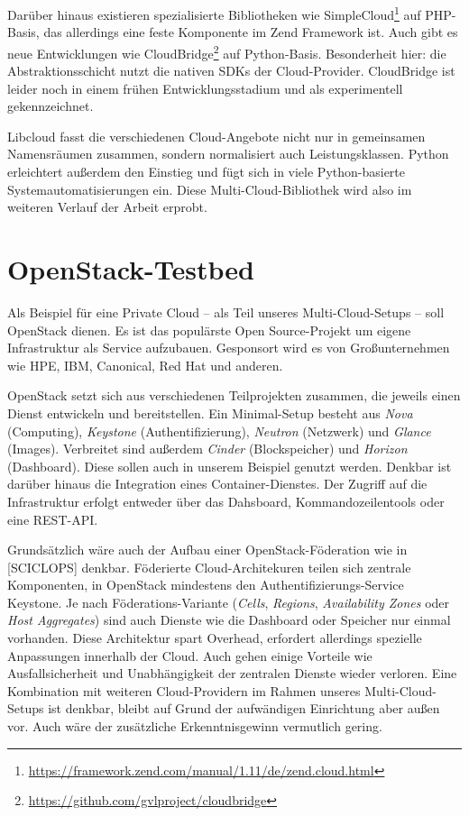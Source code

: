 Darüber hinaus existieren spezialisierte Bibliotheken wie SimpleCloud\footnote{\url{https://framework.zend.com/manual/1.11/de/zend.cloud.html}} auf PHP-Basis, das allerdings eine feste Komponente im Zend Framework ist. Auch gibt es neue Entwicklungen wie CloudBridge\footnote{\url{https://github.com/gvlproject/cloudbridge}} auf Python-Basis. Besonderheit hier: die Abstraktionsschicht nutzt die nativen SDKs der Cloud-Provider. CloudBridge ist leider noch in einem frühen Entwicklungsstadium und als experimentell gekennzeichnet.

Libcloud fasst die verschiedenen Cloud-Angebote nicht nur in gemeinsamen Namensräumen zusammen, sondern normalisiert auch Leistungsklassen. Python erleichtert außerdem den Einstieg und fügt sich in viele Python-basierte Systemautomatisierungen ein. Diese Multi-Cloud-Bibliothek wird also im weiteren Verlauf der Arbeit erprobt.


\section{OpenStack-Testbed}

Als Beispiel für eine Private Cloud -- als Teil unseres Multi-Cloud-Setups -- soll OpenStack dienen. Es ist das populärste Open Source-Projekt um eigene Infrastruktur als Service aufzubauen. Gesponsort wird es von Großunternehmen wie HPE, IBM, Canonical, Red Hat und anderen.

OpenStack setzt sich aus verschiedenen Teilprojekten zusammen, die jeweils einen Dienst entwickeln und bereitstellen. Ein Minimal-Setup besteht aus \emph{Nova} (Computing), \emph{Key\-stone} (Authentifizierung), \emph{Neutron} (Netzwerk) und \emph{Glance} (Images). Verbreitet sind außerdem \emph{Cinder} (Blockspeicher) und \emph{Horizon} (Dash\-board). Diese sollen auch in unserem Beispiel genutzt werden. Denkbar ist darüber hinaus die Integration eines Container-Dienstes. Der Zugriff auf die Infrastruktur erfolgt entweder über das Dahsboard, Kommandozeilentools oder eine REST-API.

Grundsätzlich wäre auch der Aufbau einer OpenStack-Föderation wie in [SCICLOPS] denkbar. Föderierte Cloud-Architekuren teilen sich zentrale Komponenten, in OpenStack mindestens den Authentifizierungs-Service Keystone. Je nach Föderations-Variante (\emph{Cells}, \emph{Regions}, \emph{Availability Zones} oder \emph{Host Aggregates}) sind auch Dienste wie die Dashboard oder Speicher nur einmal vorhanden. Diese Architektur spart Overhead, erfordert allerdings spezielle Anpassungen innerhalb der Cloud. Auch gehen einige Vorteile wie Ausfallsicherheit und Unabhängigkeit der zentralen Dienste wieder verloren. Eine Kombination mit weiteren Cloud-Providern im Rahmen unseres Multi-Cloud-Setups ist denkbar, bleibt auf Grund der aufwändigen Einrichtung aber außen vor. Auch wäre der zusätzliche Erkenntnisgewinn vermutlich gering.

